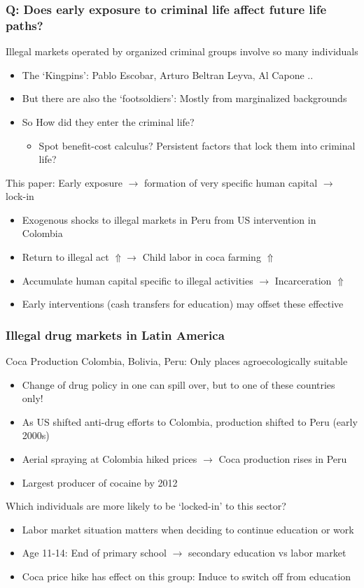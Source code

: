 \documentclass[aspectratio=169]{beamer}
\begin{document}
\begin{frame}
\frametitle{Q: Does early exposure to criminal life affect future life paths?} 
Illegal markets operated by organized criminal groups involve so many individuals
\begin{itemize}\setlength\itemsep{3pt}
\item The `Kingpins': Pablo Escobar, Arturo Beltran Leyva, Al Capone ..
\item But there are also the `footsoldiers': Mostly from marginalized backgrounds
\item So How did they enter the criminal life?
\begin{itemize}
\item Spot benefit-cost calculus? Persistent factors that lock them into criminal life?
\end{itemize}
\end{itemize}\medskip
This paper: Early exposure $\to$ formation of very specific human capital $\to$ lock-in
\begin{itemize}\setlength\itemsep{3pt}
\item Exogenous shocks to illegal markets in Peru from US intervention in Colombia
\item Return to illegal act $\Uparrow$$\to$ Child labor in coca farming $\Uparrow$
\item Accumulate human capital specific to illegal activities $\to$ Incarceration $\Uparrow$
\item Early interventions (cash transfers for education) may offset these effective
\end{itemize}\medskip
\end{frame}

\begin{frame}
\frametitle{Illegal drug markets in Latin America} 
Coca Production Colombia, Bolivia, Peru: Only places agroecologically suitable
\begin{itemize}\setlength\itemsep{3pt}
\item Change of drug policy in one can spill over, but to one of these countries only!
\item As US shifted anti-drug efforts to Colombia, production shifted to Peru (early 2000s)
\item Aerial spraying at Colombia hiked prices $\to$ Coca production rises in Peru
\item Largest producer of cocaine by 2012 
\end{itemize}\medskip
Which individuals are more likely to be `locked-in' to this sector?
\begin{itemize}\setlength\itemsep{3pt}
\item Labor market situation matters when deciding to continue education or work
\item Age 11-14: End of primary school $\to$ secondary education vs labor market
\item Coca price hike has effect on this group: Induce to switch off from education
\end{itemize}\medskip
\end{frame}
\end{document}
